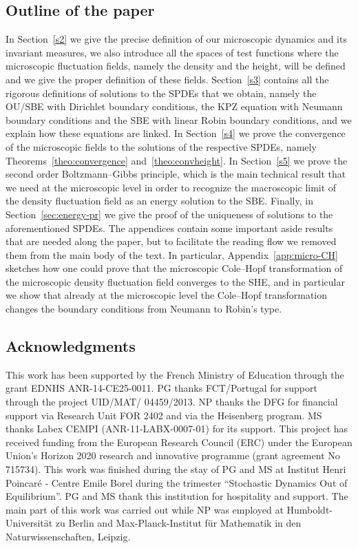 \documentclass[AHL,Unicode,longabstracts]{cedram}
\begin{document}
\subsection{Outline of the paper}
In Section~\ref{s2} we give the precise definition of our microscopic dynamics and its invariant measures, we also introduce all the spaces of test functions where the microscopic fluctuation fields, namely the density and the height, will be defined and we give the proper definition of these fields. Section~\ref{s3} contains all the rigorous definitions of solutions to the SPDEs that we obtain, namely the OU/SBE with Dirichlet boundary conditions, the KPZ equation with Neumann boundary conditions and the SBE with linear Robin boundary conditions, and we explain how these equations are linked. In Section~\ref{s4} we prove the convergence of the microscopic fields to the solutions of the respective SPDEs, namely Theorems~\ref{theo:convergence} and~\ref{theo:convheight}. In Section~\ref{s5} we prove the second order Boltzmann--Gibbs principle, which is the main technical result that we need at the microscopic level in order to recognize the macroscopic limit of the density fluctuation field as an energy solution to the SBE. Finally, in Section~\ref{sec:energy-pr} we give the proof of the uniqueness of solutions to the aforementioned SPDEs. The appendices contain some important aside results that are needed along the paper, but to facilitate the reading flow we removed them from the main body of the text. In particular, Appendix~\ref{app:micro-CH} sketches how one could prove that the microscopic Cole--Hopf transformation of the microscopic density fluctuation field converges to the SHE, and in particular we show that already at the microscopic level the Cole--Hopf transformation changes the boundary conditions from Neumann to Robin's type.

\subsection*{Acknowledgments}
This work has been supported by the French Ministry of Education through the grant EDNHS ANR-14-CE25-0011. PG thanks FCT/Portugal for support through the project UID/MAT/ 04459/2013.
NP thanks the DFG for financial support via Research Unit FOR 2402 and via the Heisenberg program.
MS thanks Labex CEMPI (ANR-11-LABX-0007-01) for its support. This project has received funding from the European Research Council (ERC) under the European Union's Horizon 2020 research and innovative programme (grant agreement No 715734). This work was finished during the stay of PG and MS at Institut Henri Poincar\'e - Centre Emile Borel during the trimester ``Stochastic Dynamics Out of Equilibrium''. PG and MS thank this institution for hospitality and support.
The main part of this work was carried out while NP was employed at Humboldt-Universität zu Berlin and Max-Planck-Institut für Mathematik in den Naturwissenschaften, Leipzig.
\end{document}
